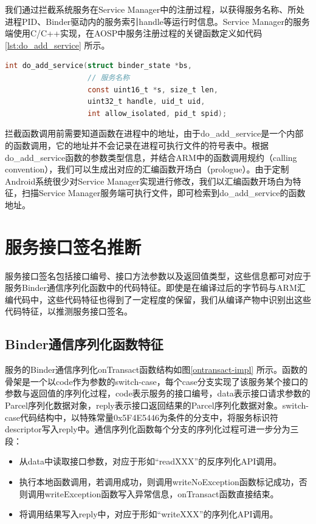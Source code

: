 \documentclass[winfonts,master,twoside]{njuthesis}
\begin{document}
我们通过拦截系统服务在Service Manager中的注册过程，以获得服务名称、所处进程PID、Binder驱动内的服务索引handle等运行时信息。Service Manager的服务端使用C/C++实现，在AOSP中服务注册过程的关键函数定义如代码\ref{lst:do_add_service} 所示。

\begin{lstlisting}[caption={服务注册函数定义},label={lst:do_add_service},language=C]
int do_add_service(struct binder_state *bs, 
                   // 服务名称
                   const uint16_t *s, size_t len, 
                   uint32_t handle, uid_t uid, 
                   int allow_isolated, pid_t spid);
\end{lstlisting}

拦截函数调用前需要知道函数在进程中的地址，由于do\_add\_service是一个内部的函数调用，它的地址并不会记录在进程可执行文件的符号表中。根据do\_add\_service函数的参数类型信息，并结合ARM中的函数调用规约（calling convention），我们可以生成出对应的汇编函数开场白（prologue）。由于定制Android系统很少对Service Manager实现进行修改，我们以汇编函数开场白为特征，扫描Service Manager服务端可执行文件，即可检索到do\_add\_service的函数地址。


\section{服务接口签名推断}

服务接口签名包括接口编号、接口方法参数以及返回值类型，这些信息都可对应于服务Binder通信序列化函数中的代码特征。即使是在编译过后的字节码与ARM汇编代码中，这些代码特征也得到了一定程度的保留，我们从编译产物中识别出这些代码特征，以推测服务接口签名。

\subsection{Binder通信序列化函数特征}

服务的Binder通信序列化onTransact函数结构如图\ref{ontransact-impl} 所示。函数的骨架是一个以code作为参数的switch-case，每个case分支实现了该服务某个接口的参数与返回值的序列化过程，code表示服务的接口编号，data表示接口请求参数的Parcel序列化数据对象，reply表示接口返回结果的Parcel序列化数据对象。switch-case代码结构中，以特殊常量0x5F4E5446为条件的分支中，将服务标识符descriptor写入reply中。通信序列化函数每个分支的序列化过程可进一步分为三段：
\begin{itemize}
	\item 从data中读取接口参数，对应于形如“readXXX”的反序列化API调用。
	\item 执行本地函数调用，若调用成功，则调用writeNoException函数标记成功，否则调用writeException函数写入异常信息，onTransact函数直接结束。
	\item 将调用结果写入reply中，对应于形如“writeXXX”的序列化API调用。
\end{itemize}
\end{document}
